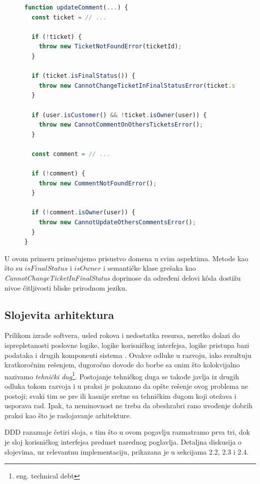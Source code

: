 \documentclass[12pt,oneside]{memoir}
\begin{document}
\begin{figure}[h]
\begin{lstlisting}[language=JavaScript, style=ES6, caption={K\^{o}d koji je na domenskom jeziku}]
function updateComment(...) {
  const ticket = // ...

  if (!ticket) {
    throw new TicketNotFoundError(ticketId);
  }

  if (ticket.isFinalStatus()) {
    throw new CannotChangeTicketInFinalStatusError(ticket.status);
  }

  if (user.isCustomer() && !ticket.isOwner(user)) {
    throw new CannotCommentOnOthersTicketsError();
  }

  const comment = // ...

  if (!comment) {
    throw new CommentNotFoundError();
  }

  if (!comment.isOwner(user)) {
    throw new CannotUpdateOthersCommentsError();
  }
}
\end{lstlisting}
\end{figure}

\newpage
U ovom primeru primećujemo prisustvo domena u svim aspektima. Metode kao što su $isFinalStatus$ i $isOwner$ i semantičke klase grešaka kao \textit{CannotChangeTicketInFinalStatus} doprinose da određeni delovi k\^{o}da dostižu nivoe čitljivosti bliske prirodnom jeziku.

\subsection{Slojevita arhitektura}
Prilikom izrade softvera, usled rokova i nedostatka resursa, neretko dolazi do isprepletanosti poslovne logike, logike korisničkog interfejsa, logike pristupa bazi podataka i drugih komponenti sistema \cite{dddfull}. Ovakve odluke u razvoju, iako rezultuju kratkoročnim rešenjem, dugoročno dovode do borbe sa onim što kolokvijalno nazivamo \textit{tehnički dug}\footnote{eng. technical debt}. Postojanje tehničkog duga se takođe javlja iz drugih odluka tokom razvoja i u praksi je pokazano da opšte rešenje ovog problema ne postoji; svaki tim se pre ili kasnije sretne sa tehničkim dugom koji otežava i usporava rad. Ipak, ta neminovnost ne treba da obeshrabri rano uvođenje dobrih praksi kao što je raslojavanje arhitekture. 

DDD razaznaje četiri sloja, s tim što u ovom pogavlju razmatramo prva tri, dok je sloj korisničkog interfejsa predmet narednog poglavlja. Detaljna diskusija o slojevima, uz relevantnu implementaciju, prikazana je u sekcijama 2.2, 2.3 i 2.4.
\end{document}
